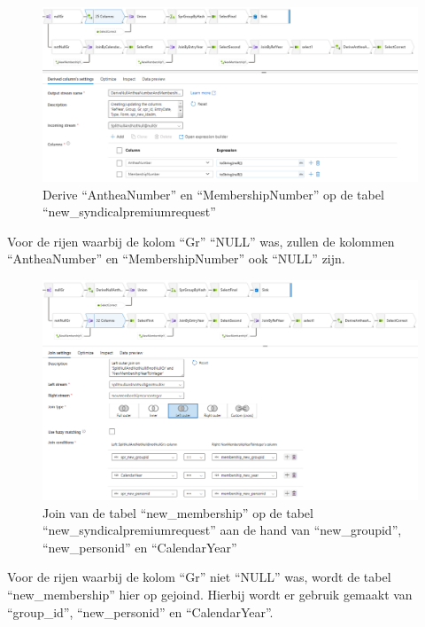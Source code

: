 \begin{figure}[H]
    \centering
    \includegraphics[width=1\textwidth]{./graphics/adf/member_2.png}
    \caption{Derive ``AntheaNumber'' en ``MembershipNumber'' op de tabel ``new\_syndicalpremiumrequest''}
\end{figure}

Voor de rijen waarbij de kolom ``Gr'' ``NULL'' was, zullen de kolommen ``AntheaNumber'' en ``MembershipNumber'' ook ``NULL'' zijn.

\begin{figure}[H]
    \centering
    \includegraphics[width=1\textwidth]{./graphics/adf/member_3.png}
    \caption{Join van de tabel ``new\_membership'' op de tabel ``new\_syndicalpremiumrequest'' aan de hand van ``new\_groupid'', ``new\_personid'' en ``CalendarYear''}
\end{figure}

Voor de rijen waarbij de kolom ``Gr'' niet ``NULL'' was, wordt de tabel ``new\_membership'' hier op gejoind. Hierbij wordt er gebruik gemaakt van ``group\_id'', ``new\_personid'' en ``CalendarYear''.

